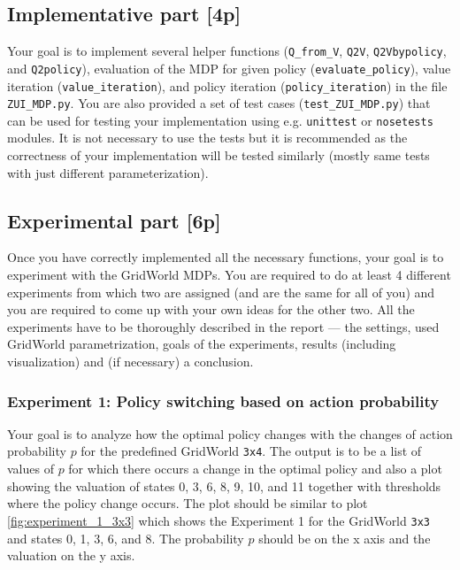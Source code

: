 \documentclass[10pt,journal,compsoc,twoside]{IEEEtran}
\begin{document}
\subsection{Implementative part [4p]}
Your goal is to implement several helper functions (\lstinline{Q_from_V}, \lstinline{Q2V}, \lstinline{Q2Vbypolicy}, and \lstinline{Q2policy}), evaluation of the MDP for given policy (\lstinline{evaluate_policy}), value iteration (\lstinline{value_iteration}), and policy iteration (\lstinline{policy_iteration}) in the file \texttt{ZUI\_MDP.py}. You are also provided a set of test cases (\texttt{test\_ZUI\_MDP.py}) that can be used for testing your implementation using e.g. \texttt{unittest} or \texttt{nosetests} modules. It is not necessary to use the tests but it is recommended as the correctness of your implementation will be tested similarly (mostly same tests with just different parameterization). 

\subsection{Experimental part [6p]}
Once you have correctly implemented all the necessary functions, your goal is to experiment with the GridWorld MDPs. You are required to do at least 4 different experiments from which two are assigned (and are the same for all of you) and you are required to come up with your own ideas for the other two. All the experiments have to be thoroughly described in the report --- the settings, used GridWorld parametrization, goals of the experiments, results (including visualization) and (if necessary) a conclusion. 

\subsubsection{Experiment 1: Policy switching based on action probability}
Your goal is to analyze how the optimal policy changes with the changes of action probability $p$ for the predefined GridWorld \texttt{3x4}. The output is to be a list of values of $p$ for which there occurs a change in the optimal policy and also a plot showing the valuation of states 0, 3, 6, 8, 9, 10, and 11 together with thresholds where the policy change occurs. The plot should be similar to plot \cref{fig:experiment_1_3x3} which shows the Experiment 1 for the GridWorld \texttt{3x3} and states 0, 1, 3, 6, and 8. The probability $p$ should be on the x axis and the valuation on the y axis.
\end{document}
